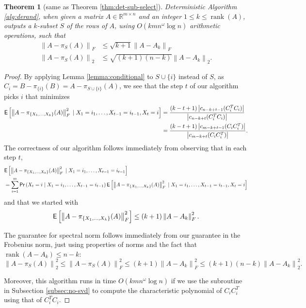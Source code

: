 \documentclass[11pt]{article}
\newcommand{\norms}[1]{{\lVert#1\rVert}^2}
\newcommand{\snorms}[1]{{\lVert#1\rVert}_2^2}
\newcommand{\rank}{\operatorname{rank}}
\newtheorem{theorem}{Theorem}
\def\reals{\mathbb{R}}
\def\given{\;|\;}
\newcommand{\norm}[1]{\left\|#1\right\|}
\newcommand{\frob}[1]{\left\|#1\right\|_{F}}
\newcommand{\prob}[1]{{\sf Pr} \left(#1\right)}
\newcommand{\expec}[1]{{\sf E} \left[#1\right]}
\newcommand{\abs}[1]{\left|#1\right|}
\begin{document}
\begin{theorem}[same as Theorem \ref{thm:det-sub-select}]
Deterministic Algorithm \ref{alg:derand}, when given a matrix $A \in \reals^{m \times n}$ and an integer $1 \leq k \leq \rank(A)$, outputs a $k$-subset $S$ of the rows of $A$, using $O(kmn^{\omega} \log n)$ arithmetic operations, such that
\begin{align*}
\frob{A - \pi_{S}(A)} & \leq \sqrt{k+1} \frob{A - A_{k}} \\
\norm{A - \pi_{S}(A)}_{2} & \leq \sqrt{(k+1)(n-k)} \norm{A - A_{k}}_{2}.
\end{align*}
\end{theorem}
\begin{proof}
By applying Lemma \ref{lemma:conditional} to $S \cup \{i\}$ instead of $S$, as $C_{i} = B - \pi_{\{i\}}(B) = A - \pi_{S \cup \{i\}}(A)$, we see that the step $t$ of our algorithm picks $i$ that minimizes
\begin{align*}
\expec{\frob{A - \pi_{\{X_{1}, \dotsc, X_{k}\}}(A)}^{2} \given X_{1} = i_{1}, \dots, X_{t-1} = i_{t-1}, X_{t} = i} & = \frac{(k-t+1) \abs{c_{n-k+t-1} (C_{i}^{T} C_{i})}}{\abs{c_{n-k+t} (C_{i}^{T} C_{i})}} \\
 & = \frac{(k-t+1) \abs{c_{m-k+t-1} (C_{i} C_{i}^{T})}}{\abs{c_{m-k+t} (C_{i} C_{i}^{T})}}.
\end{align*}
The correctness of our algorithm follows immediately from observing that in each step $t$,
\begin{align*}
& \expec{\frob{A - \pi_{\{X_{1}, \dotsc, X_{k}\}}(A)}^{2} \given X_{1} = i_{1}, \dots, X_{t-1} = i_{t-1}} \\
& = \sum_{i=1}^{m} \prob{X_{t} = i \given X_{1} = i_{1}, \dotsc, X_{t-1} = i_{t-1}} \expec{\frob{A - \pi_{\{X_{1}, \dotsc, X_{k}\}}(A)}^{2} \given X_{1} = i_{1}, \dots, X_{t-1} = i_{t-1}, X_{t} = i}
\end{align*}
and that we started with
\[
\expec{\frob{A - \pi_{\{X_{1}, \dotsc, X_{k}\}}(A)}^{2}} \leq (k+1) \frob{A - A_{k}}^{2}.
\]

The guarantee for spectral norm follows immediately from our guarantee in the Frobenius norm, just using properties of norms and the fact that $\rank(A - A_{k}) \leq n-k$:
\[
\snorms{A - \pi_{S}(A)} \leq \norms{A - \pi_{S}(A)}_F \leq (k+1) \norms{A - A_{k}}_F \leq (k+1)(n-k)\snorms{A - A_{k}}.
\]

Moreover, this algorithm runs in time $O(kmn^{\omega} \log n)$ if we use the subroutine in Subsection \ref{subsec:no-svd} to compute the characteristic polynomial of $C_{i} C_{i}^{T}$ using that of $C_{i}^{T} C_{i}$.
\end{proof}
\end{document}
